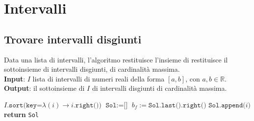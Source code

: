 \documentclass[14pt]{extreport}
\theoremstyle{definition}
\theoremstyle{definition}
\begin{document}
\section{Intervalli}

\subsection{Trovare intervalli disgiunti}

\begin{algorithm}[H]
    \caption{
        Data una lista di intervalli, l'algoritmo restituisce l'insieme di restituisce il sottoinsieme di intervalli disgiunti, di cardinalità massima.\\
        \textbf{Input}: $I$ lista di intervalli di numeri reali della forma $[a, b]$, con $a, b \in \mathbb{R}$.\\
        \textbf{Output}: il sottoinsieme di $I$ di intervalli disgiunti di cardinalità massima.
    }

    \begin{algorithmic}[1]
        \label{intervalli1}
            \State $I\texttt{.sort(key=}\lambda (i) \rightarrow i\texttt{.right())}$ 
            \State $\texttt{Sol}:= \texttt{[]}$
                \State $b_f := \texttt{Sol.last().right()}$ 
                 
                    \State $\texttt{Sol.append(}i\texttt{)}$
                \EndIf
            \EndFor
            \State \textbf{return} \texttt{Sol}
        \EndFunction
    \end{algorithmic}
\end{algorithm}
\end{document}
